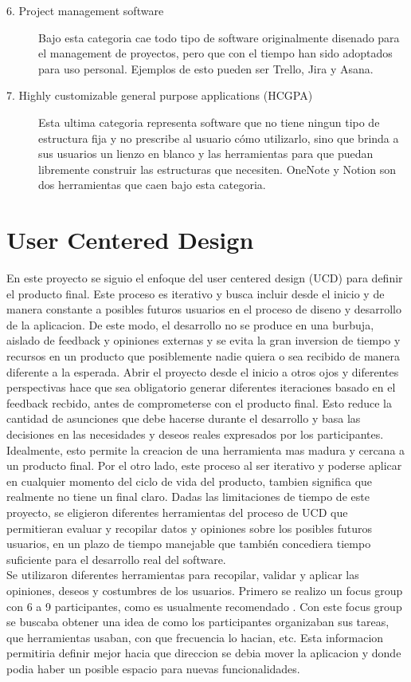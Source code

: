 \begin{description}
    \item [6. Project management software] Bajo esta categoria cae todo tipo de software originalmente disenado para el management de proyectos, pero que con el tiempo han sido adoptados para uso personal. Ejemplos de esto pueden ser Trello, Jira y Asana.
    \item [7. Highly customizable general purpose applications (HCGPA)] Esta ultima categoria representa software que no tiene ningun tipo de estructura fija y no prescribe al usuario cómo utilizarlo, sino que brinda a sus usuarios un lienzo en blanco y las herramientas para que puedan libremente construir las estructuras que necesiten. OneNote y Notion son dos herramientas que caen bajo esta categoria. 
\end{description}

\section{User Centered Design}
En este proyecto se siguio el enfoque del user centered design (UCD) para definir el producto final. Este proceso es iterativo y busca incluir desde el inicio y de manera constante a posibles futuros usuarios en el proceso de diseno y desarrollo de la aplicacion. De este modo, el desarrollo no se produce en una burbuja, aislado de feedback y opiniones externas y se evita la gran inversion de tiempo y recursos en un producto que posiblemente nadie quiera o sea recibido de manera diferente a la esperada. Abrir el proyecto desde el inicio a otros ojos y diferentes perspectivas hace que sea obligatorio generar diferentes iteraciones basado en el feedback recbido, antes de comprometerse con el producto final. Esto reduce la cantidad de asunciones que debe hacerse durante el desarrollo y basa las decisiones en las necesidades y deseos reales expresados por los participantes. Idealmente, esto permite la creacion de una herramienta mas madura y cercana a un producto final. 
Por el otro lado, este proceso al ser iterativo y poderse aplicar en cualquier momento del ciclo de vida del producto, tambien significa que realmente no tiene un final claro. Dadas las limitaciones de tiempo de este proyecto, se eligieron diferentes herramientas del proceso de UCD que permitieran evaluar y recopilar datos y opiniones sobre los posibles futuros usuarios, en un plazo de tiempo manejable que también concediera tiempo suficiente para el desarrollo real del software.
\\
Se utilizaron diferentes herramientas para recopilar, validar y aplicar las opiniones, deseos y costumbres de los usuarios. Primero se realizo un focus group con 6 a 9 participantes, como es usualmente recomendado \cite{}. Con este focus group se buscaba obtener una idea de como los participantes organizaban sus tareas, que herramientas usaban, con que frecuencia lo hacian, etc. Esta informacion permitiria definir mejor hacia que direccion se debia mover la aplicacion y donde podia haber un posible espacio para nuevas funcionalidades. 
